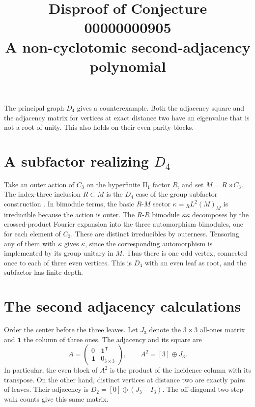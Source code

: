\documentclass[11pt]{article}
\title{Disproof of Conjecture 00000000905\\
\large A non-cyclotomic second-adjacency polynomial}
\author{}
\date{}
\begin{document}
\maketitle

The principal graph \(D_4\) gives a counterexample. Both the
adjacency square and the adjacency matrix for vertices at exact
distance two have an eigenvalue that is not a root of unity.
This also holds on their even parity blocks.

\section*{A subfactor realizing \(D_4\)}

Take an outer action of \(C_3\) on the hyperfinite
\(\mathrm{II}_1\) factor \(R\), and set \(M=R\rtimes C_3\).
The index-three inclusion \(R\subset M\) is the \(D_4\) case
of the group subfactor construction \cite[Sections~1 and~2.3]{izumi}.
In bimodule terms, the basic \(R\)-\(M\) sector
\(\kappa={}_R L^2(M)_M\) is irreducible because the action is outer.
The \(R\)-\(R\) bimodule \(\kappa\overline{\kappa}\) decomposes
by the crossed-product Fourier expansion into the three
automorphism bimodules, one for each element of \(C_3\).
These are distinct irreducibles by outerness. Tensoring any of
them with \(\kappa\) gives \(\kappa\), since the corresponding
automorphism is implemented by its group unitary in \(M\).
Thus there is one odd vertex, connected once to each of three
even vertices. This is \(D_4\) with an even leaf as root,
and the subfactor has finite depth.

\section*{The second adjacency calculations}

Order the center before the three leaves. Let \(J_3\) denote the
\(3\times3\) all-ones matrix and \(\mathbf 1\) the column of three
ones. The adjacency and its square are
\[
  A=\begin{pmatrix}0&\mathbf 1^{\mathsf T}\\
                   \mathbf 1&0_{3\times3}\end{pmatrix},
  \qquad A^2=[3]\oplus J_3 .
\]
In particular, the even block of \(A^2\) is the product of the
incidence column with its transpose. On the other hand, distinct
vertices at distance two are exactly pairs of leaves. Their
adjacency is \(D_2=[0]\oplus(J_3-I_3)\). The off-diagonal
two-step-walk counts give this same matrix.
\end{document}
